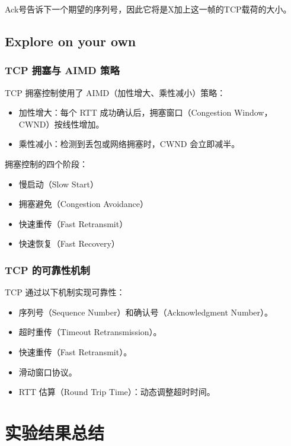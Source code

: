 \documentclass[14pt,a4paper,UTF8,twoside]{article}
\begin{document}
Ack号告诉下一个期望的序列号，因此它将是X加上这一帧的TCP载荷的大小。

\subsection{Explore on your own}

\subsubsection{TCP 拥塞与 AIMD 策略}

TCP 拥塞控制使用了 AIMD（加性增大、乘性减小）策略：

\begin{itemize}
	\item 加性增大：每个 RTT 成功确认后，拥塞窗口（Congestion Window，CWND）按线性增加。
	\item 乘性减小：检测到丢包或网络拥塞时，CWND 会立即减半。
\end{itemize}

拥塞控制的四个阶段：

\begin{itemize}
	\item 慢启动（Slow Start）
	\item 拥塞避免（Congestion Avoidance）
	\item 快速重传（Fast Retransmit）
	\item 快速恢复（Fast Recovery）
\end{itemize}

\subsubsection{TCP 的可靠性机制}

TCP 通过以下机制实现可靠性：

\begin{itemize}
	\item 序列号（Sequence Number）和确认号（Acknowledgment Number）。
	\item 超时重传（Timeout Retransmission）。
	\item 快速重传（Fast Retransmit）。
	\item 滑动窗口协议。
	\item RTT 估算（Round Trip Time）：动态调整超时时间。
\end{itemize}

\section{实验结果总结}
\end{document}
